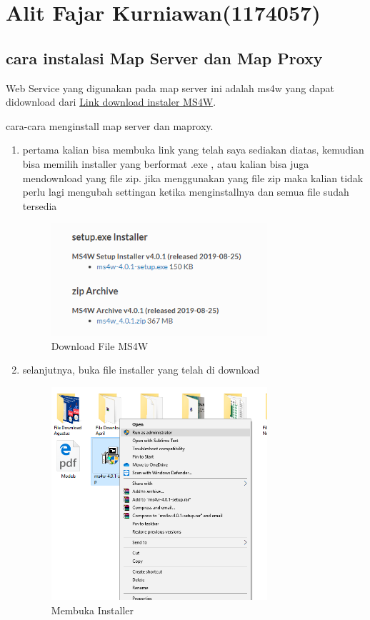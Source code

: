 \section{Alit Fajar Kurniawan(1174057)}
\subsection{cara instalasi Map Server dan Map Proxy}
Web Service yang digunakan pada map server ini adalah ms4w yang dapat didownload dari \href{https://ms4w.com/download.html#download}{Link download instaler MS4W}.

cara-cara menginstall map server dan maproxy.
\begin{enumerate}
    \item pertama kalian bisa membuka link yang telah saya sediakan diatas, kemudian bisa memilih installer yang berformat .exe , atau kalian bisa juga mendownload yang file zip. jika menggunakan yang file zip maka kalian tidak perlu lagi mengubah settingan ketika menginstallnya dan semua file sudah tersedia
    \hfill\break
	\begin{figure}[H]
		\includegraphics[width=8cm]{figures/1174057/4Tugassatu.png}
		\centering
		\caption{Download File MS4W}
	\end{figure}

	\item selanjutnya, buka file installer yang telah di download
    \hfill\break
	\begin{figure}[H]
		\includegraphics[width=8cm]{figures/1174057/4Tugasdua.PNG}
		\centering
		\caption{Membuka Installer}
	\end{figure}


\end{enumerate}
